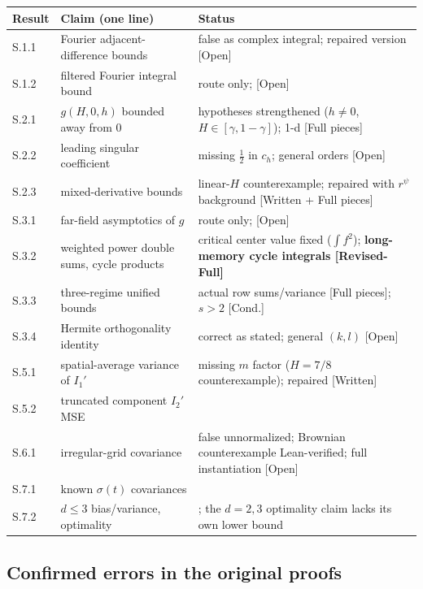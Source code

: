 \documentclass[11pt]{article}
\theoremstyle{definition}
\theoremstyle{remark}
\begin{document}
\begin{table}[h]\centering\footnotesize
\begin{tabularx}{\textwidth}{@{}p{}p{}>{\raggedright\arraybackslash}X@{}}
\toprule
Result & Claim (one line) & Status \\
\midrule
S.1.1 & Fourier adjacent-difference bounds & false as complex integral; repaired version [Open] \\
S.1.2 & filtered Fourier integral bound & route only; [Open] \\
S.2.1 & $g(H,0,h)$ bounded away from $0$ & hypotheses strengthened ($h\neq0$, $H\in[\gamma,1-\gamma]$); 1-d [Full pieces] \\
S.2.2 & leading singular coefficient & missing $\tfrac12$ in $c_h$; general orders [Open] \\
S.2.3 & mixed-derivative bounds & linear-$H$ counterexample; repaired with $r^\psi$ background [Written + Full pieces] \\
S.3.1 & far-field asymptotics of $g$ & route only; [Open] \\
S.3.2 & weighted power double sums, cycle products & critical center value fixed ($\int f^2$); \textbf{long-memory cycle integrals [Revised-Full]} \\
S.3.3 & three-regime unified bounds & actual row sums/variance [Full pieces]; $s>2$ [Cond.] \\
S.3.4 & Hermite orthogonality identity & correct as stated; general $(k,l)$ [Open] \\
S.5.1 & spatial-average variance of $I_1'$ & missing $m$ factor ($H=7/8$ counterexample); repaired [Written] \\
S.5.2 & truncated component $I_2'$ MSE & [Written + Full pieces] \\
S.6.1 & irregular-grid covariance & false unnormalized; Brownian counterexample Lean-verified; full instantiation [Open] \\
S.7.1 & known $\sigma(t)$ covariances & [Open] \\
S.7.2 & $d\le3$ bias/variance, optimality & [Open]; the $d=2,3$ optimality claim lacks its own lower bound \\
\bottomrule
\end{tabularx}
\end{table}

\subsection{Confirmed errors in the original proofs}
\end{document}
